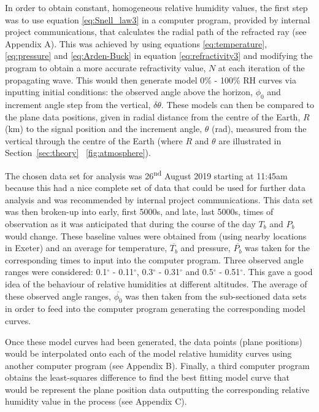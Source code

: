\documentclass{article}
\newcommand{\figref}[2][\figurename~]{#1\ref{#2}}
\newcommand{\secref}[2][Section~]{#1\ref{#2}}
\begin{document}
In order to obtain constant, homogeneous relative humidity values, the first step was to use equation \eqref{eq:Snell_law3} in a computer program, provided by internal project communications, that calculates the radial path of the refracted ray (see Appendix A). This was achieved by using equations \eqref{eq:temperature}, \eqref{eq:pressure} and \eqref{eq:Arden-Buck} in equation \eqref{eq:refractivity3} and modifying the program to obtain a more accurate refractivity value, $N$ at each iteration of the propagating wave. This would then generate model 0$\%$ - 100$\%$ RH curves via inputting initial conditions: the observed angle above the horizon, $\phi_0$ and increment angle step from the vertical, $\delta \theta$. These models can then be compared to the plane data positions, given in radial distance from the centre of the Earth, $R$ (km) to the signal position and the increment angle, $\theta$ (rad), measured from the vertical through the centre of the Earth (where $R$ and $\theta$ are illustrated in \secref{sec:theory} \figref{fig:atmosphere}). 

\vspace{2mm}
\noindent
The chosen data set for analysis was 26\textsuperscript{nd} August 2019 starting at 11:45am because this had a nice complete set of data that could be used for further data analysis and was recommended by internal project communications. This data set was then broken-up into early, first 5000s, and late, last 5000s, times of observation as it was anticipated that during the course of the day $T_b$ and $P_b$ would change. These baseline values were obtained from \cite{Web01} (using nearby locations in Exeter) and an average for temperature, $\overline{T_b}$ and pressure, $\overline{P_b}$ was taken for the corresponding times to input into the computer program. Three observed angle ranges were considered: 0.1$^{\circ}$ - 0.11$^{\circ}$, 0.3$^{\circ}$ - 0.31$^{\circ}$ and 0.5$^{\circ}$ - 0.51$^{\circ}$. This gave a good idea of the behaviour of relative humidities at different altitudes. The average of these observed angle ranges, $\overline{\phi_0}$ was then taken from the sub-sectioned data sets in order to feed into the computer program generating the corresponding model curves.

\vspace{2mm}
\noindent
Once these model curves had been generated, the data points (plane positions) would be interpolated onto each of the model relative humidity curves using another computer program (see Appendix B). Finally, a third computer program obtains the least-squares difference to find the best fitting model curve that would be represent the plane position data outputting the corresponding relative humidity value in the process (see Appendix C).
\end{document}
